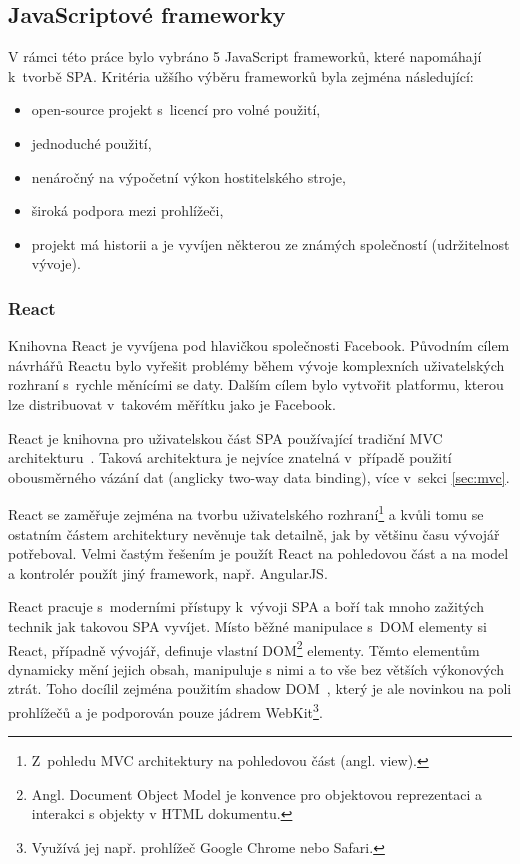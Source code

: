 \subsection{JavaScriptové frameworky}

V rámci této práce bylo vybráno 5 JavaScript frameworků, které napomáhají k~tvorbě SPA. Kritéria užšího výběru frameworků byla zejména následující:

\begin{itemize}  
\item open-source projekt s~licencí pro volné použití,
\item jednoduché použití,
\item nenáročný na výpočetní výkon hostitelského stroje,
\item široká podpora mezi prohlížeči,
\item projekt má historii a je vyvíjen některou ze známých společností (udržitelnost vývoje).
\end{itemize}

\subsubsection*{React~\cite{react}}
Knihovna React je vyvíjena pod hlavičkou společnosti Facebook. Původním cílem návrhářů Reactu bylo vyřešit problémy během vývoje komplexních uživatelských rozhraní s~rychle měnícími se daty. Dalším cílem bylo vytvořit platformu, kterou lze distribuovat v~takovém měřítku jako je Facebook.

React je knihovna pro uživatelskou část SPA používající tradiční MVC architekturu~\cite{mvc}. Taková architektura je nejvíce znatelná v~případě použití obousměrného vázání dat (anglicky two-way data binding), více v~sekci \ref{sec:mvc}.

React se zaměřuje zejména na tvorbu uživatelského rozhraní\footnote{Z~pohledu MVC architektury na pohledovou část (angl. view).} a kvůli tomu se ostatním částem architektury nevěnuje tak detailně, jak by většinu času vývojář potřeboval. Velmi častým řešením je použít React na pohledovou část a na model a kontrolér použít jiný framework, např. AngularJS.

React pracuje s~moderními přístupy k~vývoji SPA a boří tak mnoho zažitých technik jak takovou SPA vyvíjet. Místo běžné manipulace s~DOM elementy si React, případně vývojář, definuje vlastní DOM\footnote{Angl. Document Object Model je konvence pro objektovou reprezentaci a interakci s objekty v HTML dokumentu.} elementy. Těmto elementům dynamicky mění jejich obsah, manipuluje s nimi a to vše bez větších výkonových ztrát. Toho docílil zejména použitím shadow DOM~\cite{shadowdom}, který je ale novinkou na poli prohlížečů a je podporován pouze jádrem WebKit\footnote{Využívá jej např. prohlížeč Google Chrome nebo Safari.}. 

